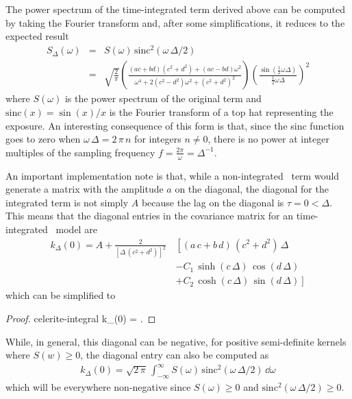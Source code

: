 \documentclass[modern]{aastex62}
\begin{document}
The power spectrum of the time-integrated term derived above can be computed by taking the Fourier transform and, after some simplifications, it reduces to the expected result
\begin{eqnarray}
S_\Delta(\omega) &=& S(\omega)\,\mathrm{sinc}^{2}(\omega\,\Delta/2)\nonumber\\
&=& \sqrt{\frac{2}{\pi}} \left(\frac{(ac+bd)(c^2+d^2)+(ac-bd)\omega^2}
  {\omega^4+2(c^2-d^2)\omega^2+(c^2+d^2)^2}\right)
  \left( \frac{\sin(\tfrac{1}{2}\omega \Delta)}{\tfrac{1}{2}\omega\Delta}\right)^2
\end{eqnarray}
where $S(\omega)$ is the power spectrum of the original term and $\mathrm{sinc}(x) = \sin(x)/x$ is the Fourier transform of a top hat representing the exposure.
An interesting consequence of this form is that, since the sinc function goes to zero when $\omega\,\Delta = 2\,\pi\,n$ for integers $n \ne 0$, there is no power at integer multiples of the sampling frequency $f = \frac{2\pi}{\omega} = \Delta^{-1}$.

An important implementation note is that, while a non-integrated \celerite\ term would generate a matrix with the amplitude $a$ on the diagonal, the diagonal for the integrated term is not simply $A$ because the lag on the diagonal is $\tau = 0 < \Delta$.
This means that the diagonal entries in the covariance matrix for an time-integrated \celerite\ model are
\begin{align}
k_\Delta(0) = A + \frac{2}{[\Delta\,(c^2+d^2)]^2}\,&\left[
  (a\,c + b\,d)\,(c^2 + d^2)\,\Delta \right. \nonumber\\
  & - C_1\,\sinh(c\,\Delta)\,\cos(d\,\Delta) \nonumber\\
  & \left. + C_2\,\cosh(c\,\Delta)\,\sin(d\,\Delta)\right]
\end{align}
which can be simplified to
\begin{proof}{celerite-integral}
k_\Delta(0) = 
\quad.
\end{proof}
While, in general, this diagonal can be negative, for positive semi-definite kernels where $S(w) \ge 0$, the diagonal entry can also be computed as
\begin{eqnarray}
k_\Delta (0) = \sqrt{2\,\pi}\,\int_{-\infty} ^{\infty} S(\omega)\,\mathrm{sinc}^2(\omega\,\Delta/2)\,\dd\omega
\end{eqnarray}
which will be everywhere non-negative since $S(\omega) \ge 0$ and $\mathrm{sinc}^2(\omega\,\Delta/2) \ge 0$.
\end{document}

